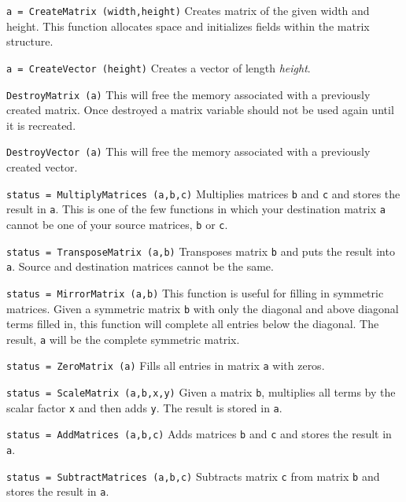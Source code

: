 \begin{dispitems}
\item [\tt a = CreateMatrix (width,height)]
 Creates matrix of the given width and height.  This function allocates
 space and initializes fields within the matrix structure.

\item [\tt a = CreateVector (height)]
 Creates a vector of length {\em height}.

\item [\tt DestroyMatrix (a)]
 This will free the memory associated with a previously created matrix.
 Once destroyed a matrix variable should not be used again until it
 is recreated.

\item [\tt DestroyVector (a)]
 This will free the memory associated with a previously created vector.

\item [\tt status = MultiplyMatrices (a,b,c)]
 Multiplies matrices {\tt b} and {\tt c} and stores the result in {\tt a}.
 This is one of the few functions in which your destination matrix {\tt a} 
 cannot be one of your source matrices, {\tt b} or {\tt c}.

\item [\tt status = TransposeMatrix (a,b)]
 Transposes matrix {\tt b} and puts the result into {\tt a}.  
 Source and destination matrices cannot be the same.

\item [\tt status = MirrorMatrix (a,b)]
 This function is useful for filling in symmetric matrices.  Given a symmetric
 matrix {\tt b} with only the diagonal and above diagonal terms filled in,
 this function will complete all entries below the diagonal.  The result,
 {\tt a} will be the complete symmetric matrix.

\item [\tt status = ZeroMatrix (a)]
 Fills all entries in matrix {\tt a} with zeros.

\item [\tt status = ScaleMatrix (a,b,x,y)]
 Given a matrix {\tt b}, multiplies all terms by the scalar factor
 {\tt x} and then adds {\tt y}.  The result is stored in {\tt a}.

\item [\tt status = AddMatrices (a,b,c)]
 Adds matrices {\tt b} and {\tt c} and stores the result in {\tt a}.

\item [\tt status = SubtractMatrices (a,b,c)]
 Subtracts matrix {\tt c} from matrix {\tt b} and stores the result in {\tt a}.
\end{dispitems}

